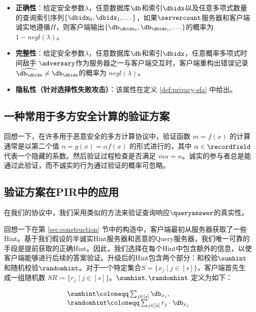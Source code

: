 \begin{definition}
    \begin{itemize}
        \item \textbf{正确性}：给定安全参数$\lambda$，任意数据库$\db$和索引$\dbidx$以及任意多项式数量的查询索引序列$\{\dbidx_0,\dbidx_1, \dots\}$，如果$\servercount$服务器和客户端诚实地遵循$\Pi$，则客户端输出$\{\db_{\dbidx_0},\db_{\dbidx_1}, \dots\}$的概率为$1-negl(\lambda)$。
        \item \textbf{完整性}：给定安全参数$\lambda$，任意数据库$\db$和索引$\dbidx$，任意概率多项式时间敌手 $\adversary$作为服务器之一与客户端交互时，客户端重构出错误记录$\widehat{\db_\dbidx} \neq \db_\dbidx$的概率为 $negl(\lambda)$。
        \item \textbf{隐私性（针对选择性失败攻击）}：该属性在定义 \ref{def:privacy-sfa} 中给出。
    \end{itemize}
\end{definition}
\subsection{一种常用于多方安全计算的验证方案}
回想一下，在许多用于恶意安全的多方计算协议中，验证函数 $m = f(x)$ 的计算通常是以第二个值 $n = g(x) = \alpha f(x)$ 的形式进行的，其中 $\alpha \in \recordfield$ 代表一个隐藏的系数。然后验证过程检查是否满足 $m\alpha = n$。诚实的参与者总是能通过此验证，而不诚实的行为通过验证的概率可忽略。

\subsection{验证方案在PIR中的应用}

在我们的协议中，我们采用类似的方法来验证查询响应$\queryanswer$的真实性。

回想一下在第 \ref{sec:construction} 节中的构造中，客户端最初从服务器获取了一些Hint。基于我们假设的半诚实Hint服务器和恶意的Query服务器，我们唯一可靠的手段是提前获取的正确Hint。因此，我们选择在每个Hint中包含额外的信息，以使客户端能够进行后续的答案验证。升级后的Hint包含两个部分：和校验$\sumhint$和随机校验$\randomhint$。对于一个特定集合$S = \{x_j \mid j\in [s]\}$，客户端首先生成一组随机数 $SR\coloneqq \{r_j \mid j\in [s]\}$。$\sumhint, \randomhint$ 定义为如下：

$$
    \begin{array}{l}
        \sumhint \coloneqq  \sum_{j \in [s]} \db_{x_j}, \\
        \randomhint \coloneqq  \sum_{j \in [s]} r_j\cdot \db_{x_j}
    \end{array}
$$

